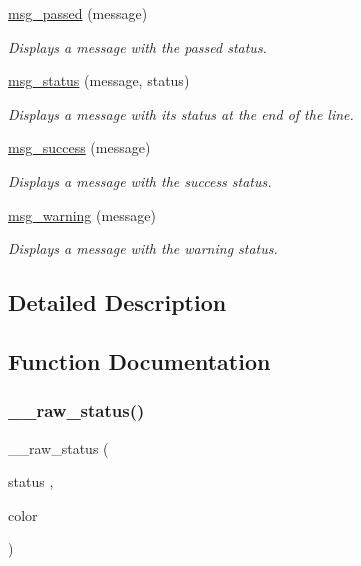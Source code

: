 \begin{DoxyCompactItemize}
\hyperlink{group__message_ga9df650b1c1239ff41a66696efa81efcd}{msg\+\_\+passed} (message)
\begin{DoxyCompactList}\small\item\em Displays a message with the \textquotesingle{}passed\textquotesingle{} status. \end{DoxyCompactList}\item 
\hyperlink{group__message_gad80ab7ec02b8c2f8a2c53ff732a07db2}{msg\+\_\+status} (message, status)
\begin{DoxyCompactList}\small\item\em Displays a message with its status at the end of the line. \end{DoxyCompactList}\item 
\hyperlink{group__message_ga34a1aa638a3fb510d440f5de95a903dc}{msg\+\_\+success} (message)
\begin{DoxyCompactList}\small\item\em Displays a message with the \textquotesingle{}success\textquotesingle{} status. \end{DoxyCompactList}\item 
\hyperlink{group__message_gae7ed668c9e2b1cf86059082cc6e28024}{msg\+\_\+warning} (message)
\begin{DoxyCompactList}\small\item\em Displays a message with the \textquotesingle{}warning\textquotesingle{} status. \end{DoxyCompactList}\end{DoxyCompactItemize}


\subsection{Detailed Description}


\subsection{Function Documentation}
\mbox{\label{group__message_gab8cefae01bd7be88bdefd3f719682cc2}} 
\subsubsection{\texorpdfstring{\+\_\+\+\_\+raw\+\_\+status()}{\_\_raw\_status()}}
{\footnotesize\ttfamily \+\_\+\+\_\+raw\+\_\+status (\begin{DoxyParamCaption}\item[{status}]{,  }\item[{color}]{ }\end{DoxyParamCaption})}



